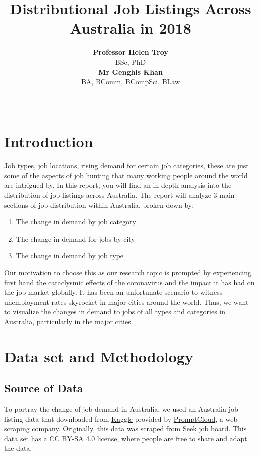 \documentclass[11pt,a4paper,]{article}
\title{Distributional Job Listings Across Australia in 2018}
\author{\sf\Large\textbf{Professor Helen Troy}\\ {\sf\large BSc, PhD\\[0.5cm]} \sf\Large\textbf{Mr Genghis Khan}\\ {\sf\large BA, BComm, BCompSci, BLaw\\[0.5cm]}}
\date{\sf\Date~\Month~\Year}
\makeatletter
\providecommand{\tightlist}{%
  \setlength{\itemsep}{0pt}\setlength{\parskip}{0pt}}
\def\titlepage{\front{\expandafter{\@title}}{\@author}{\@organization}}
\makeatother
\begin{document}
\titlepage

\hypertarget{introduction}{%
\section{Introduction}\label{introduction}}

Job types, job locations, rising demand for certain job categories, these are just some of the aspects of job hunting that many working people around the world are intrigued by. In this report, you will find an in depth analysis into the distribution of job listings across Australia. The report will analyze 3 main sections of job distribution within Australia, broken down by:

\begin{enumerate}
\def\labelenumi{\arabic{enumi})}
\tightlist
\item
  The change in demand by job category
\item
  The change in demand for jobs by city
\item
  The change in demand by job type
\end{enumerate}

Our motivation to choose this as our research topic is prompted by experiencing first hand the cataclysmic effects of the coronavirus and the impact it has had on the job market globally. It has been an unfortunate scenario to witness unemployment rates skyrocket in major cities around the world. Thus, we want to visualize the changes in demand to jobs of all types and categories in Australia, particularly in the major cities.

\hypertarget{data-set-and-methodology}{%
\section{Data set and Methodology}\label{data-set-and-methodology}}

\hypertarget{source-of-data}{%
\subsection{Source of Data}\label{source-of-data}}

To portray the change of job demand in Australia, we used an Australia job listing data that downloaded from \href{https://www.kaggle.com/PromptCloudHQ/australian-job-listings-data-from-seek-job-board}{Kaggle} provided by \href{https://www.promptcloud.com}{PromptCloud}, a web-scraping company. Originally, this data was scraped from \href{https://www.seek.com.au}{Seek} job board. This data set has a \href{https://creativecommons.org/licenses/by-sa/4.0/}{CC BY-SA 4.0} license, where people are free to share and adapt the data.
\end{document}
